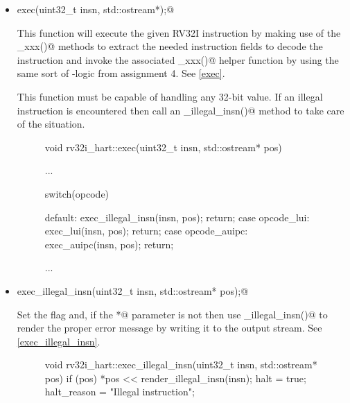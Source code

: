 \documentclass{article}
\begin{document}
\begin{itemize}
\item \verb@void exec(uint32_t insn, std::ostream*);@

This function will execute the given RV32I instruction by making use of the 
\verb@get_xxx()@ methods to extract the needed instruction fields to decode the
instruction and invoke the associated \verb@exec_xxx()@ helper function by using the 
same sort of \verb@switch@-logic from assignment 4. See \autoref{exec}.

This function must be capable of handling any 32-bit \verb@insn@ value. 
If an illegal instruction is encountered then call an 
\verb@exec_illegal_insn()@ method to take care of the situation.


\begin{figure}[ht]
\begin{minipage}{\textwidth}
\centering
\begin{tty}
void rv32i_hart::exec(uint32_t insn, std::ostream* pos)
{
	...

    switch(opcode)
    {
    default:                exec_illegal_insn(insn, pos); return;
    case opcode_lui:        exec_lui(insn, pos); return;
    case opcode_auipc:      exec_auipc(insn, pos); return;

    ...
	}
}
\end{tty}
\end{minipage}
\label{exec}
\end{figure}










\item \verb@void exec_illegal_insn(uint32_t insn, std::ostream* pos);@

Set the \verb@halt@ flag and, if the \verb@ostream*@ parameter is not 
\verb@nullptr@ then
use \verb@render_illegal_insn()@ to render the proper error message
by writing it to the \verb@pos@ output stream. See \autoref{exec_illegal_insn}.

\begin{figure}[ht]
\begin{minipage}{\textwidth}
{\small
\begin{tty}
void rv32i_hart::exec_illegal_insn(uint32_t insn, std::ostream* pos)
{
    if (pos)
        *pos << render_illegal_insn(insn);
    halt = true;
    halt_reason = "Illegal instruction";
}
\end{tty}
}\end{minipage}
\label{exec_illegal_insn}
\end{figure}






\end{itemize}
\end{document}
